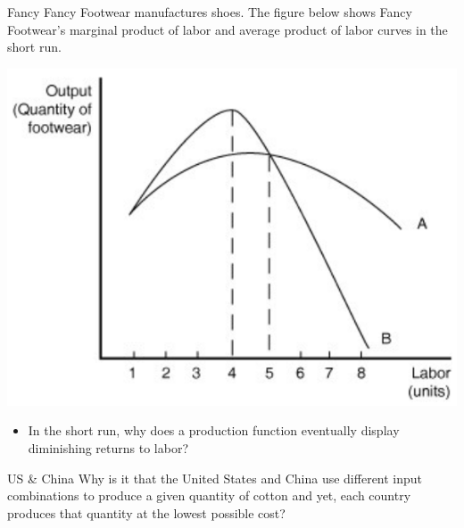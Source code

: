 \documentclass{beamer}
\begin{document}
\begin{frame}[t]{Fancy}
    Fancy Footwear manufactures shoes. The figure below shows Fancy Footwear's marginal product of labor and average product of labor curves in the short run.
    \begin{center}
        \includegraphics[scale = .6]{images/graph.png}
    \end{center}
    \begin{itemize}
        \item In the short run, why does a production function eventually display diminishing returns to labor?
    \end{itemize}
\end{frame}

\begin{frame}{US \& China}
    Why is it that the United States and China use different input combinations to produce a given quantity of cotton and yet, each country produces that quantity at the lowest possible cost?
\end{frame}
\end{document}
